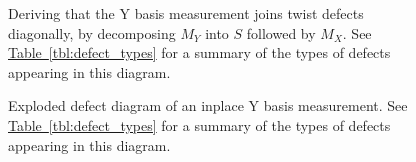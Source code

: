 \documentclass[onecolumn,unpublished,a4paper]{quantumarticle}
\theoremstyle{definition}
\theoremstyle{definition}
\theoremstyle{definition}
\newcommand{\tbl}[1]{\hyperref[tbl:#1]{Table~\ref*{tbl:#1}}}
\begin{document}
\begin{figure}[h]
    \centering
    \caption{
        Deriving that the Y basis measurement joins twist defects diagonally, by decomposing $M_Y$ into $S$ followed by $M_X$.
        See \tbl{defect_types} for a summary of the types of defects appearing in this diagram.
    }
    \label{fig:topological_decomposition}
\end{figure}

\begin{figure}
    \centering
    \caption{
        Exploded defect diagram of an inplace Y basis measurement.
        See \tbl{defect_types} for a summary of the types of defects appearing in this diagram.
    }
    \label{fig:topological_explosion}
\end{figure}
\end{document}

